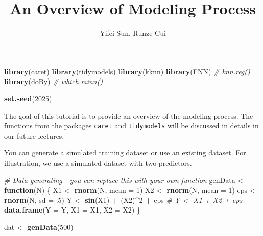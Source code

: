 \documentclass[
]{article}
\title{An Overview of Modeling Process}
\author{Yifei Sun, Runze Cui}
\date{}
\newenvironment{Shaded}{\begin{snugshade}}{\end{snugshade}}
\newcommand{\AttributeTok}[1]{\textcolor[rgb]{0.13,0.29,0.53}{#1}}
\newcommand{\CommentTok}[1]{\textcolor[rgb]{0.56,0.35,0.01}{\textit{#1}}}
\newcommand{\ControlFlowTok}[1]{\textcolor[rgb]{0.13,0.29,0.53}{\textbf{#1}}}
\newcommand{\DecValTok}[1]{\textcolor[rgb]{0.00,0.00,0.81}{#1}}
\newcommand{\FunctionTok}[1]{\textcolor[rgb]{0.13,0.29,0.53}{\textbf{#1}}}
\newcommand{\NormalTok}[1]{#1}
\newcommand{\OtherTok}[1]{\textcolor[rgb]{0.56,0.35,0.01}{#1}}
\newcommand{\SpecialCharTok}[1]{\textcolor[rgb]{0.81,0.36,0.00}{\textbf{#1}}}
\begin{document}
\maketitle

{
\setcounter{tocdepth}{2}
\tableofcontents
}
\newpage

\begin{Shaded}
\begin{Highlighting}[]
\FunctionTok{library}\NormalTok{(caret)}
\FunctionTok{library}\NormalTok{(tidymodels)}
\FunctionTok{library}\NormalTok{(kknn)}
\FunctionTok{library}\NormalTok{(FNN) }\CommentTok{\# knn.reg()}
\FunctionTok{library}\NormalTok{(doBy) }\CommentTok{\# which.minn()}

\FunctionTok{set.seed}\NormalTok{(}\DecValTok{2025}\NormalTok{)}
\end{Highlighting}
\end{Shaded}

The goal of this tutorial is to provide an overview of the modeling
process. The functions from the packages \texttt{caret} and
\texttt{tidymodels} will be discussed in details in our future lectures.

You can generate a simulated training dataset or use an existing
dataset. For illustration, we use a simulated dataset with two
predictors.

\begin{Shaded}
\begin{Highlighting}[]
\CommentTok{\# Data generating {-} you can replace this with your own function}
\NormalTok{genData }\OtherTok{\textless{}{-}} \ControlFlowTok{function}\NormalTok{(N)}
\NormalTok{\{}
\NormalTok{  X1 }\OtherTok{\textless{}{-}} \FunctionTok{rnorm}\NormalTok{(N, }\AttributeTok{mean =} \DecValTok{1}\NormalTok{)}
\NormalTok{  X2 }\OtherTok{\textless{}{-}} \FunctionTok{rnorm}\NormalTok{(N, }\AttributeTok{mean =} \DecValTok{1}\NormalTok{)}
\NormalTok{  eps }\OtherTok{\textless{}{-}} \FunctionTok{rnorm}\NormalTok{(N, }\AttributeTok{sd =}\NormalTok{ .}\DecValTok{5}\NormalTok{)}
\NormalTok{  Y }\OtherTok{\textless{}{-}} \FunctionTok{sin}\NormalTok{(X1) }\SpecialCharTok{+}\NormalTok{ (X2)}\SpecialCharTok{\^{}}\DecValTok{2} \SpecialCharTok{+}\NormalTok{ eps }
  \CommentTok{\# Y \textless{}{-} X1 + X2 + eps}
  \FunctionTok{data.frame}\NormalTok{(}\AttributeTok{Y =}\NormalTok{ Y, }\AttributeTok{X1 =}\NormalTok{ X1, }\AttributeTok{X2 =}\NormalTok{ X2)}
\NormalTok{\}}

\NormalTok{dat }\OtherTok{\textless{}{-}} \FunctionTok{genData}\NormalTok{(}\DecValTok{500}\NormalTok{)}
\end{Highlighting}
\end{Shaded}
\end{document}
